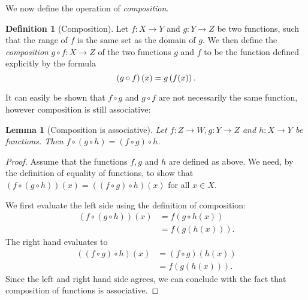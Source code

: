 \documentclass[a4paper, twocolumn]{report}
\newcounter{dummy} \numberwithin{dummy}{section}
\newtheorem{lma}[dummy]{Lemma}
\theoremstyle{definition}
\newtheorem{defn}[dummy]{Definition}
\theoremstyle{solution}
\begin{document}
We now define the operation of \textit{composition}.

\begin{defn}[Composition]
  \label{defn_3310}
  Let $f : X \rightarrow Y$ and $g : Y \rightarrow Z$ be two functions, such
  that the range of $f$ is the same set as the domain of $g$.  We then define
  the \textit{composition} $g \circ f : X \rightarrow Z$ of the two functions
  $g$ and $f$ to be the function defined explicitly by the formula
  \begin{equation}
    \notag
    \left( g\circ f \right)(x) = g\left( f(x) \right).
  \end{equation}
\end{defn}
\addtocounter{dummy}{1}
It can easily be shown that $f \circ g$ and $g \circ f$ are not necessarily the
same function, however composition is still associative:

\begin{lma}[Composition is associative]
  \label{lma_3312}
  Let $f : Z \rightarrow W, g : Y \rightarrow Z$ and $h : X \rightarrow Y$ be
  functions. Then $f \circ (g \circ h) = (f \circ g) \circ h$.
\end{lma}

\begin{proof}
 Assume that the functions $f, g$ and $h$ are defined as above.  We need, by
 the definition of equality of functions, to show that $(f \circ (g\circ h))(x)
 = \left( (f \circ g) \circ h \right)(x)$ for all $x \in X$. 

 We first evaluate the left side using the definition of composition:
 \begin{align*}
   \left( f \circ (g \circ h) \right)(x) &= f( g \circ h(x))\\
   &= f(g(h(x))).
 \end{align*}
 The right hand evaluates to
 \begin{align*}
   \left( (f\circ g) \circ h \right)(x) &= (f \circ g)(h(x))\\
   &= f(g(h(x))).
 \end{align*}
 Since the left and right hand side agrees, we can conclude with the fact that
 composition of functions is associative.
\end{proof}

\todos
\end{document}
